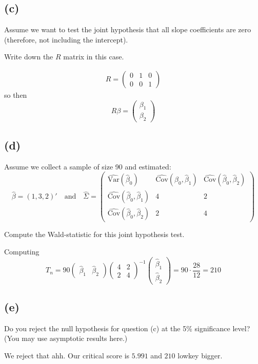 \documentclass[11pt]{article}
\begin{document}
\subsection*{(c)}

Assume we want to test the joint hypothesis that all slope coefficients are zero (therefore, not including the intercept).

Write down the \( R \) matrix in this case.

\begin{solution}
    \begin{align*}
        R = \begin{pmatrix}
            0 & 1 & 0\\
            0 & 0 & 1
        \end{pmatrix}
    \end{align*} so then 
    \[R\beta = \begin{pmatrix}
        \beta_1\\ \beta_2
    \end{pmatrix}\]
\end{solution}

\subsection*{(d)}

Assume we collect a sample of size 90 and estimated:
\[
\hat{\beta} = (1, 3, 2)' \quad \text{and} \quad
\hat{\Sigma} =
\begin{pmatrix}
\widehat{\text{Var}}(\hat{\beta}_0) & \widehat{\text{Cov}}(\hat{\beta}_0, \hat{\beta}_1) & \widehat{\text{Cov}}(\hat{\beta}_0, \hat{\beta}_2) \\
\widehat{\text{Cov}}(\hat{\beta}_0, \hat{\beta}_1) & 4 & 2 \\
\widehat{\text{Cov}}(\hat{\beta}_0, \hat{\beta}_2) & 2 & 4
\end{pmatrix}
\]

Compute the Wald-statistic for this joint hypothesis test.
\begin{solution}
    Computing 
    \[T_n = 90 \begin{pmatrix}
        \hat\beta_1 & \hat\beta_2
    \end{pmatrix} \begin{pmatrix}
        4 & 2\\ 
         2 & 4
    \end{pmatrix}^{-1}\begin{pmatrix}
         \hat\beta_1 \\ \hat\beta_2
    \end{pmatrix} = 90 \cdot \frac{28}{12} =210 \]
\end{solution}

\subsection*{(e)}

Do you reject the null hypothesis for question (c) at the 5\% significance level? (You may use asymptotic results here.)
\begin{solution}
    We reject that ahh. Our critical score is $5.991$ and $210$ lowkey bigger. 
\end{solution}
\end{document}
